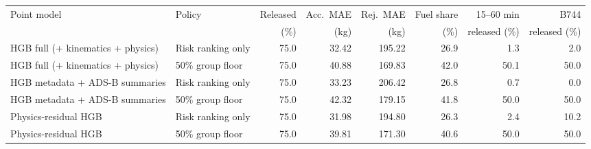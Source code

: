 \begin{tabular}{llrrrrrr}
\toprule
Point model & Policy & Released & Acc.\ MAE & Rej.\ MAE & Fuel share & 15--60 min & B744 \\
 & & (\%) & (kg) & (kg) & (\%) & released (\%) & released (\%) \\
\midrule
HGB full (+ kinematics + physics) & Risk ranking only & 75.0 & 32.42 & 195.22 & 26.9 & 1.3 & 2.0 \\
HGB full (+ kinematics + physics) & 50\% group floor & 75.0 & 40.88 & 169.83 & 42.0 & 50.1 & 50.0 \\
HGB metadata + ADS-B summaries & Risk ranking only & 75.0 & 33.23 & 206.42 & 26.8 & 0.7 & 0.0 \\
HGB metadata + ADS-B summaries & 50\% group floor & 75.0 & 42.32 & 179.15 & 41.8 & 50.0 & 50.0 \\
Physics-residual HGB & Risk ranking only & 75.0 & 31.98 & 194.80 & 26.3 & 2.4 & 10.2 \\
Physics-residual HGB & 50\% group floor & 75.0 & 39.81 & 171.30 & 40.6 & 50.0 & 50.0 \\
\bottomrule
\end{tabular}
